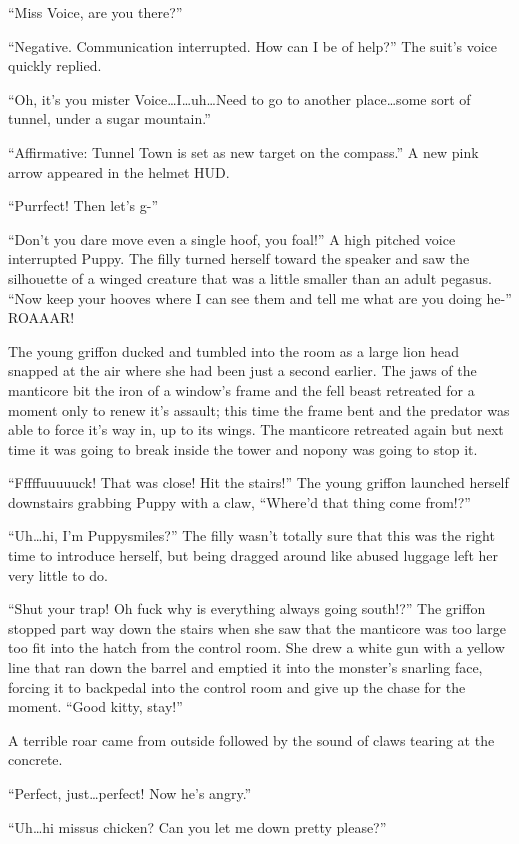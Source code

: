 ``Miss Voice, are you there?''

``{\mt Negative. Communication interrupted. How can I be of help?}'' The suit's voice quickly replied.

``Oh, it's you mister Voice\dots I\dots uh\dots Need to go to another place\dots some sort of tunnel, under a sugar mountain.''

``{\mt Affirmative: Tunnel Town is set as new target on the compass.}'' A new pink arrow appeared in the helmet HUD.

``Purrfect! Then let's g-''

``Don't you dare move even a single hoof, you foal!'' A high pitched voice interrupted Puppy. The filly turned herself toward the speaker and saw the silhouette of a winged creature that was a little smaller than an adult pegasus. ``Now keep your hooves where I can see them and tell me what are you doing he-'' ROAAAR!

The young griffon ducked and tumbled into the room as a large lion head snapped at the air where she had been just a second earlier. The jaws of the manticore bit the iron of a window's frame and the fell beast retreated for a moment only to renew it's assault; this time the frame bent and the predator was able to force it's way in, up to its wings. The manticore retreated again but next time it was going to break inside the tower and nopony was going to stop it.

``Fffffuuuuuck! That was close! Hit the stairs!'' The young griffon launched herself downstairs grabbing Puppy with a claw, ``Where'd that thing come from!?''

``Uh\dots hi, I'm Puppysmiles?'' The filly wasn't totally sure that this was the right time to introduce herself, but being dragged around like abused luggage left her very little to do.

``Shut your trap! Oh fuck why is everything always going south!?'' The griffon stopped part way down the stairs when she saw that the manticore was too large too fit into the hatch from the control room. She drew a white gun with a yellow line that ran down the barrel and emptied it into the monster's snarling face, forcing it to backpedal into the control room and give up the chase for the moment. ``Good kitty, stay!''

A terrible roar came from outside followed by the sound of claws tearing at the concrete.

``Perfect, just\dots perfect! Now he's angry.''

``Uh\dots hi missus chicken? Can you let me down pretty please?''

